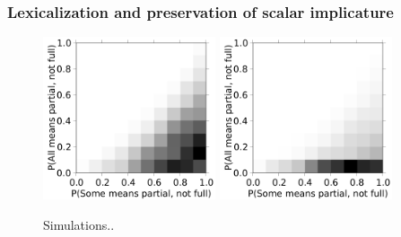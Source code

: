\documentclass{article} %
\begin{document}
%





\subsubsection{Lexicalization and preservation of scalar implicature}


\begin{figure}
\centering
\includegraphics[width=2in]{figures/some-all-only-pragmatic.pdf}
\includegraphics[width=2in]{figures/some-all-pragmatic+unambiguous.pdf}
\caption{\label{fig:scalar} Simulations..}
\end{figure}
\end{document}

